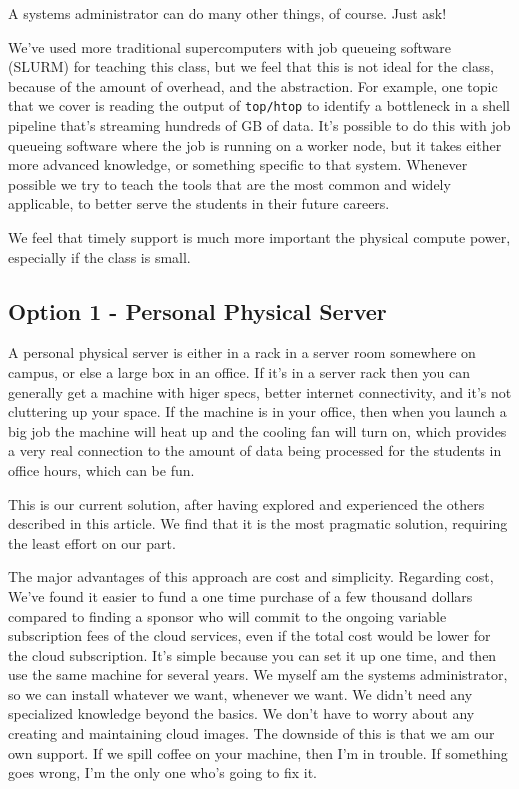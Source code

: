 \documentclass[12pt]{article}
\begin{document}
A systems administrator can do many other things, of course.
Just ask!

We've used more traditional supercomputers with job queueing software (SLURM) for teaching this class, but we feel that this is not ideal for the class, because of the amount of overhead, and the abstraction.
For example, one topic that we cover is reading the output of \texttt{top/htop} to identify a bottleneck in a shell pipeline that's streaming hundreds of GB of data.
It's possible to do this with job queueing software where the job is running on a worker node, but it takes either more advanced knowledge, or something specific to that system.
Whenever possible we try to teach the tools that are the most common and widely applicable, to better serve the students in their future careers.

We feel that timely support is much more important the physical compute power, especially if the class is small.

\subsection{Option 1 - Personal Physical Server}

A personal physical server is either in a rack in a server room somewhere on campus, or else a large box in an office.
If it's in a server rack then you can generally get a machine with higer specs, better internet connectivity, and it's not cluttering up your space.
If the machine is in your office, then when you launch a big job the machine will heat up and the cooling fan will turn on, which provides a very real connection to the amount of data being processed for the students in office hours, which can be fun.

This is our current solution, after having explored and experienced the others described in this article.
We find that it is the most pragmatic solution, requiring the least effort on our part.

The major advantages of this approach are cost and simplicity.
Regarding cost, We've found it easier to fund a one time purchase of a few thousand dollars compared to finding a sponsor who will commit to the ongoing variable subscription fees of the cloud services, even if the total cost would be lower for the cloud subscription.
It's simple because you can set it up one time, and then use the same machine for several years.
We myself am the systems administrator, so we can install whatever we want, whenever we want.
We didn't need any specialized knowledge beyond the basics.
We don't have to worry about any creating and maintaining cloud images.
The downside of this is that we am our own support.
If we spill coffee on your machine, then I'm in trouble.
If something goes wrong, I'm the only one who's going to fix it.
\end{document}
